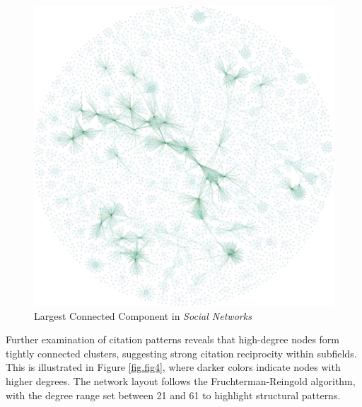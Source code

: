 \documentclass[twocolumn]{article}
\begin{document}
	\begin{figure}[htbp]
		\centering
		\includegraphics[width=\columnwidth]{"Social Networks/Gephi/largest_component.pdf"}
		\caption{Largest Connected Component in \textit{Social Networks}}
		\label{fig.fig3}
	\end{figure}
	
	Further examination of citation patterns reveals that high-degree nodes form tightly connected clusters, suggesting strong citation reciprocity within subfields. This is illustrated in Figure \ref{fig.fig4}, where darker colors indicate nodes with higher degrees. The network layout follows the Fruchterman-Reingold algorithm, with the degree range set between 21 and 61 to highlight structural patterns.
	
\end{document}
